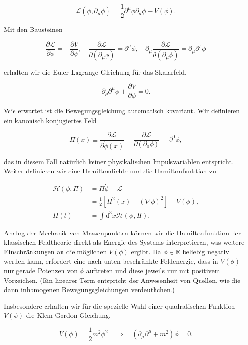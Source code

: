 \documentclass[10pt, letterpaper]{article}
\begin{document}
$$
\mathscr{L}\left(\phi, \partial_{\mu} \phi\right)=\frac{1}{2} \partial^{\mu} \phi \partial_{\mu} \phi-V(\phi) .
$$

Mit den Bausteinen

$$
\frac{\partial \mathscr{L}}{\partial \phi}=-\frac{\partial V}{\partial \phi}, \quad \frac{\partial \mathscr{L}}{\partial\left(\partial_{\mu} \phi\right)}=\partial^{\mu} \phi, \quad \partial_{\mu} \frac{\partial \mathscr{L}}{\partial\left(\partial_{\mu} \phi\right)}=\partial_{\mu} \partial^{\mu} \phi
$$

erhalten wir die Euler-Lagrange-Gleichung für das Skalarfeld,

$$
\partial_{\mu} \partial^{\mu} \phi+\frac{\partial V}{\partial \phi}=0 .
$$

Wie erwartet ist die Bewegungsgleichung automatisch kovariant. Wir definieren ein kanonisch konjugiertes Feld

$$
\Pi(x) \equiv \frac{\partial \mathscr{L}}{\partial \dot{\phi}(x)}=\frac{\partial \mathscr{L}}{\partial\left(\partial_{0} \phi\right)}=\partial^{0} \phi,
$$

das in diesem Fall natürlich keiner physikalischen Impulsvariablen entspricht. Weiter definieren wir eine Hamiltondichte und die Hamiltonfunktion zu

$$
\begin{aligned}
\mathscr{H}(\phi, \Pi) & =\Pi \dot{\phi}-\mathscr{L} \\
& =\frac{1}{2}\left[\Pi^{2}(x)+(\nabla \phi)^{2}\right]+V(\phi), \\
H(t) & =\int \mathrm{d}^{3} x \mathscr{H}(\phi, \Pi) .
\end{aligned}
$$

Analog der Mechanik von Massenpunkten können wir die Hamiltonfunktion der klassischen Feldtheorie direkt als Energie des Systems interpretieren, was weitere Einschränkungen an die möglichen $V(\phi)$ ergibt. Da $\phi \in \mathbb{R}$ beliebig negativ werden kann, erfordert eine nach unten beschränkte Feldenergie, dass in $V(\phi)$ nur gerade Potenzen von $\phi$ auftreten und diese jeweils nur mit positivem Vorzeichen. (Ein linearer Term entspricht der Anwesenheit von Quellen, wie die dann inhomogenen Bewegungsgleichungen verdeutlichen.)

Insbesondere erhalten wir für die spezielle Wahl einer quadratischen Funktion $V(\phi)$ die Klein-Gordon-Gleichung,

$$
V(\phi)=\frac{1}{2} m^{2} \phi^{2} \quad \Rightarrow \quad\left(\partial_{\mu} \partial^{\mu}+m^{2}\right) \phi=0 .
$$
\end{document}
